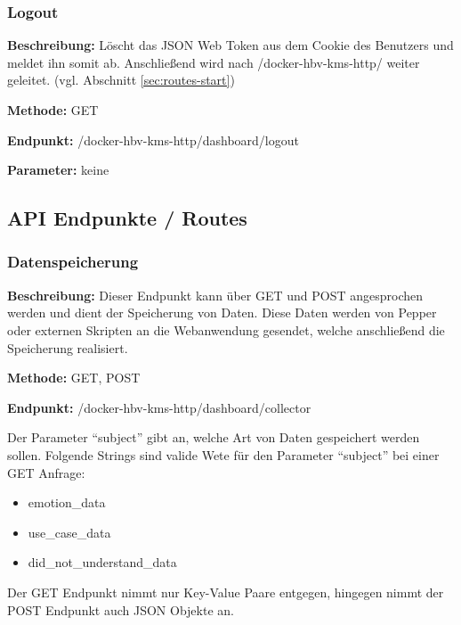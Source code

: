 \subsubsection{Logout}
\label{sec:routes-logout}
\textbf{Beschreibung:} Löscht das JSON Web Token aus dem Cookie des Benutzers und meldet ihn somit ab.
Anschließend wird nach /docker-hbv-kms-http/ weiter geleitet. (vgl. Abschnitt \ref{sec:routes-start})

\textbf{Methode:} GET

\textbf{Endpunkt:} /docker-hbv-kms-http/dashboard/logout

\textbf{Parameter:} keine

\dotfill






\subsection{API Endpunkte / Routes}
\label{sec:api-routes}

\subsubsection{Datenspeicherung}
\label{sec:api-save-data}
\textbf{Beschreibung:} Dieser Endpunkt kann über GET und POST angesprochen werden und dient der
Speicherung von Daten. Diese Daten werden von Pepper oder externen Skripten an die Webanwendung gesendet,
welche anschließend die Speicherung realisiert.

\textbf{Methode:} GET, POST

\textbf{Endpunkt:} /docker-hbv-kms-http/dashboard/collector

Der Parameter ``subject'' gibt an, welche Art von Daten gespeichert werden sollen.
Folgende Strings sind valide Wete für den Parameter ``subject'' bei einer GET Anfrage:
\begin{itemize}
    \item emotion\_data
    \item use\_case\_data
    \item did\_not\_understand\_data
\end{itemize}

Der GET Endpunkt nimmt nur Key-Value Paare entgegen, hingegen nimmt der POST Endpunkt auch JSON Objekte an.

